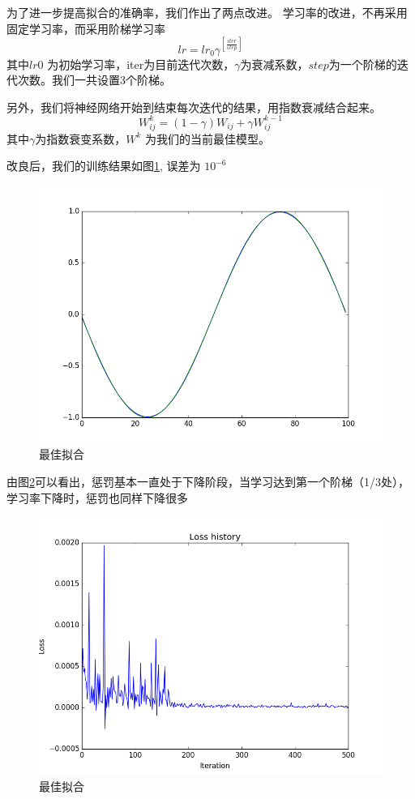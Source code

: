 \documentclass[twocolumn]{article}
\begin{document}
\begin{CJK}{UTF8}{gkai}
为了进一步提高拟合的准确率，我们作出了两点改进。
学习率的改进，不再采用固定学习率，而采用阶梯学习率
\begin{equation}
	lr = lr_0  \gamma^{[\frac{iter}{step}]}
\end{equation}
其中$lr0$ 为初始学习率，iter为目前迭代次数，$\gamma$为衰减系数，$step$为一个阶梯的迭代次数。我们一共设置3个阶梯。

另外，我们将神经网络开始到结束每次迭代的结果，用指数衰减结合起来\cite{karpathy2016cs231n}。
\begin{equation}
W^k_{ij} = (1-\gamma) W_{ij}  + \gamma W^{k-1}_{ij}
\end{equation}
其中$\gamma$为指数衰变系数，$W^k$ 为我们的当前最佳模型。

改良后，我们的训练结果如图\ref{fig:fig2}, 误差为 $10^{-6}$
\begin{figure}
	\centering
	\includegraphics[width=\linewidth]{../fig2}
	\caption{最佳拟合}
	\label{fig:fig2}
\end{figure}

由图\ref{fig:loss}可以看出，惩罚基本一直处于下降阶段，当学习达到第一个阶梯（1/3处），学习率下降时，惩罚也同样下降很多
\begin{figure}[h]
	\centering
	\includegraphics[width=\linewidth]{../loss}
	\caption{最佳拟合}
	\label{fig:loss}
\end{figure}


\end{CJK}
\end{document}
